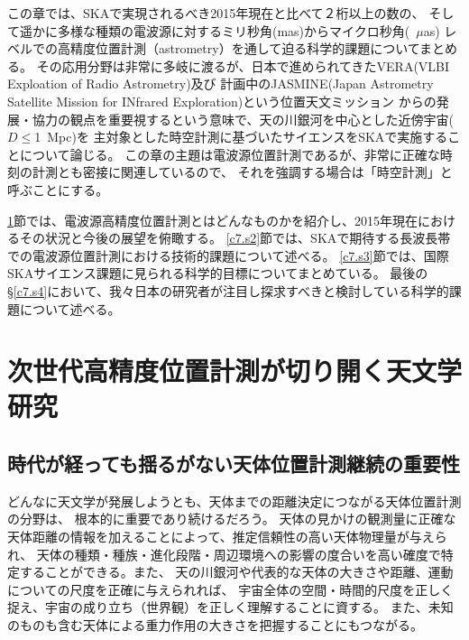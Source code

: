 

\def\uas{~$\mu$as}
\def\ch3oh{CH$_3$OH}
\def\h2o{H$_2$O}
\def\arcsec{$^{\prime\prime}$}
\def\kms{~km~s$^{-1}$}


この章では、SKAで実現されるべき2015年現在と比べて２桁以上の数の、
そして遥かに多様な種類の電波源に対するミリ秒角(mas)からマイクロ秒角(\uas)
レベルでの高精度位置計測（astrometry）を通して迫る科学的課題についてまとめる。
その応用分野は非常に多岐に渡るが、日本で進められてきたVERA(VLBI Exploation of Radio Astrometry)及び
計画中のJASMINE(Japan Astrometry Satellite Mission for INfrared Exploration)という位置天文ミッション
からの発展・協力の観点を重要視するという意味で、天の川銀河を中心とした近傍宇宙($D\leq$1~Mpc)を
主対象とした時空計測に基づいたサイエンスをSKAで実施することについて論じる。
この章の主題は電波源位置計測であるが、非常に正確な時刻の計測とも密接に関連しているので、
それを強調する場合は「時空計測」と呼ぶことにする。

\ref{c7.s1}節では、電波源高精度位置計測とはどんなものかを紹介し、2015年現在におけるその状況と今後の展望を俯瞰する。
\ref{c7.s2}節では、SKAで期待する長波長帯での電波源位置計測における技術的課題について述べる。
\ref{c7.s3}節では、国際SKAサイエンス課題に見られる科学的目標についてまとめている。
最後の\S \ref{c7.s4}において、我々日本の研究者が注目し探求すべきと検討している科学的課題について述べる。

\setcounter{section}{0}\section{次世代高精度位置計測が切り開く天文学研究}\label{c7.s1}

\setcounter{subsection}{0}\subsection{時代が経っても揺るがない天体位置計測継続の重要性}\label{c7.s1.ss1}

どんなに天文学が発展しようとも、天体までの距離決定につながる天体位置計測の分野は、
根本的に重要であり続けるだろう。
天体の見かけの観測量に正確な天体距離の情報を加えることによって、推定信頼性の高い天体物理量が与えられ、
天体の種類・種族・進化段階・周辺環境への影響の度合いを高い確度で特定することができる。また、
天の川銀河や代表的な天体の大きさや距離、運動についての尺度を正確に与えられれば、
宇宙全体の空間・時間的尺度を正しく捉え、宇宙の成り立ち（世界観）を正しく理解することに資する。
また、未知のものも含む天体による重力作用の大きさを把握することにもつながる。

